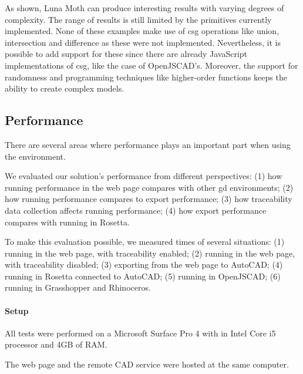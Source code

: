 As shown, Luna Moth can produce interesting results with varying degrees of complexity.
The range of results is still limited by the primitives currently implemented.
None of these examples make use of \gls{csg} operations like union, intersection and difference as these were not implemented.
Nevertheless, it is possible to add support for these since there are already JavaScript implementations of \gls{csg}, like the case of OpenJSCAD's.
Moreover, the support for randomness and programming techniques like higher-order functions keeps the ability to create complex models.




\subsection{Performance}
There are several areas where performance plays an important part when using the environment.

We evaluated our solution's performance from different perspectives:
(1) how running performance in the web page compares with other \gls{gd} environments;
(2) how running performance compares to export performance;
(3) how traceability data collection affects running performance;
(4) how export performance compares with running in Rosetta.

To make this evaluation possible, we measured times of several situations:
(1) running in the web page, with traceability enabled;
(2) running in the web page, with traceability disabled;
(3) exporting from the web page to AutoCAD;
(4) running in Rosetta connected to AutoCAD;
(5) running in OpenJSCAD;
(6) running in Grasshopper and Rhinoceros.

\paragraph{Setup}
All tests were performed on a Microsoft Surface Pro 4 with in Intel Core i5 processor and 4GB of RAM.

The web page and the remote CAD service were hosted at the same computer.


